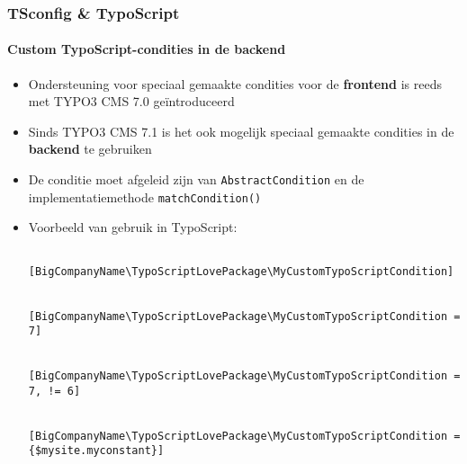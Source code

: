
\begin{frame}[fragile]
	\frametitle{TSconfig \& TypoScript}
	\framesubtitle{Custom TypoScript-condities in de backend}

	\lstset{basicstyle=\tiny\ttfamily}

	\begin{itemize}
	
		\item Ondersteuning voor speciaal gemaakte condities voor de \textbf{frontend} is reeds met
		TYPO3 CMS 7.0 geïntroduceerd
		\item Sinds TYPO3 CMS 7.1 is het ook mogelijk speciaal gemaakte condities in de \textbf{backend} te gebruiken
		\item De conditie moet afgeleid zijn van \texttt{AbstractCondition} en de implementatiemethode \texttt{matchCondition()}
		\item Voorbeeld van gebruik in TypoScript: 

			\begin{lstlisting}
				[BigCompanyName\TypoScriptLovePackage\MyCustomTypoScriptCondition]

				[BigCompanyName\TypoScriptLovePackage\MyCustomTypoScriptCondition = 7]

				[BigCompanyName\TypoScriptLovePackage\MyCustomTypoScriptCondition = 7, != 6]

				[BigCompanyName\TypoScriptLovePackage\MyCustomTypoScriptCondition = {$mysite.myconstant}]
			\end{lstlisting}

	\end{itemize}

\end{frame}


